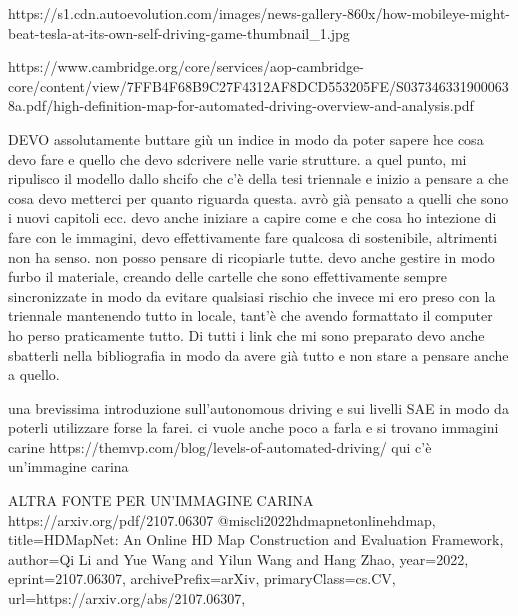 https://s1.cdn.autoevolution.com/images/news-gallery-860x/how-mobileye-might-beat-tesla-at-its-own-self-driving-game-thumbnail_1.jpg

https://www.cambridge.org/core/services/aop-cambridge-core/content/view/7FFB4F68B9C27F4312AF8DCD553205FE/S0373463319000638a.pdf/high-definition-map-for-automated-driving-overview-and-analysis.pdf

DEVO assolutamente buttare giù un indice in modo da poter sapere hce cosa devo fare e quello che devo sdcrivere nelle varie strutture. a quel punto, mi ripulisco il modello dallo shcifo che c'è della tesi triennale e inizio a pensare a che cosa devo metterci per quanto riguarda questa. avrò già pensato a quelli che sono i nuovi capitoli ecc. 
devo anche iniziare a capire come e che cosa ho intezione di fare con le immagini, devo effettivamente fare qualcosa di sostenibile, altrimenti non ha senso. non posso pensare di ricopiarle tutte.
devo anche gestire in modo furbo il materiale, creando delle cartelle che sono effettivamente sempre sincronizzate in modo da evitare qualsiasi rischio che invece mi ero preso con la triennale mantenendo tutto in locale, tant'è che avendo formattato il computer ho perso praticamente tutto.
Di tutti i link che mi sono preparato devo anche sbatterli nella bibliografia in modo da avere già tutto e non stare a pensare anche a quello.


una brevissima introduzione sull'autonomous driving e sui livelli SAE in modo da poterli utilizzare forse la farei. ci vuole anche poco a farla e si trovano immagini carine 
https://themvp.com/blog/levels-of-automated-driving/
qui c'è un'immagine carina 



ALTRA FONTE PER UN'IMMAGINE CARINA 
https://arxiv.org/pdf/2107.06307
@misc{li2022hdmapnetonlinehdmap,
      title={HDMapNet: An Online HD Map Construction and Evaluation Framework}, 
      author={Qi Li and Yue Wang and Yilun Wang and Hang Zhao},
      year={2022},
      eprint={2107.06307},
      archivePrefix={arXiv},
      primaryClass={cs.CV},
      url={https://arxiv.org/abs/2107.06307}, 
}
